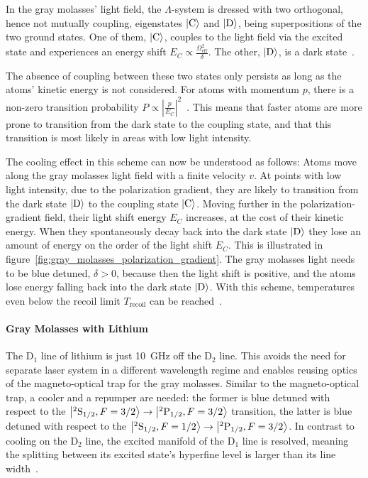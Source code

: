 In the gray molasses' light field, the $\Lambda$-system is dressed with two orthogonal, hence not mutually coupling, eigenstates $\Ket{\text{C}}$ and $\Ket{\text{D}}$, being superpositions of the two ground states. One of them, $\Ket{\text{C}}$, couples to the light field via the excited state and experiences an energy shift $E_C \propto \frac{\Omega_\text{eff}^2}{\delta}$. The other, $\Ket{\text{D}}$, is a dark state~\cite{weidemuller_novel_1994,gerken_gray_2016}.

The absence of coupling between these two states only persists as long as the atoms' kinetic energy is not considered. For atoms with momentum $p$, there is a non-zero transition probability $P \propto \left|\frac{p}{E_C} \right|^2$~\cite{weidemuller_novel_1994}. This means that faster atoms are more prone to transition from the dark state to the coupling state, and that this transition is most likely in areas with low light intensity.

The cooling effect in this scheme can now be understood as follows: Atoms move along the gray molasses light field with a finite velocity $v$. At points with low light intensity, due to the polarization gradient, they are likely to transition from the dark state $\Ket{\text{D}}$ to the coupling state $\Ket{\text{C}}$. Moving further in the polarization-gradient field, their light shift energy $E_C$ increases, at the cost of their kinetic energy. When they spontaneously decay back into the dark state $\Ket{\text{D}}$ they lose an amount of energy on the order of the light shift $E_C$. This is illustrated in figure~\ref{fig:gray_molasses_polarization_gradient}. The gray molasses light needs to be blue detuned, $\delta > 0$, because then the light shift is positive, and the atoms lose energy falling back into the dark state $\Ket{\text{D}}$. With this scheme,  temperatures even below the recoil limit $T_\text{recoil}$ can be reached~\cite{weidemuller_novel_1994,gerken_gray_2016}.


\paragraph{Gray Molasses with Lithium} The D$_1$ line of lithium is just \SI{10}{\giga\hertz} off the D$_2$ line. This avoids the need for separate laser system in a different wavelength regime and  enables reusing optics of the magneto-optical trap for the gray molasses. Similar to the magneto-optical trap, a cooler and a repumper are needed: the former is blue detuned with respect to the $\Ket{^2\text{S}_{1/2}, F = 3/2} \rightarrow \Ket{^2\text{P}_{1/2}, F = 3/2}$ transition, the latter is blue detuned with respect to the $\Ket{^2\text{S}_{1/2}, F = 1/2} \rightarrow \Ket{^2\text{P}_{1/2}, F = 3/2}$. In contrast to cooling on the D$_2$ line, the excited manifold of the D$_1$ line is resolved, meaning the splitting between its excited state's hyperfine level is larger than its line width~\cite{gerken_gray_2016}.


